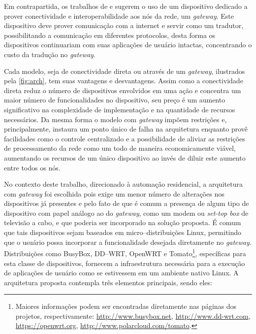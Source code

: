 \documentclass[twoside,english,brazilian]{UNISINOSmonografia}
\begin{document}
Em contrapartida, os trabalhos de  e 
 sugerem o uso de um dispositivo dedicado a prover 
conectividade e interoperabilidade aos nós da rede, um \textit{gateway}.
Este dispositivo deve prover comunicação com a internet e servir como um 
tradutor, possibilitando a comunicação em diferentes protocolos, desta forma 
os dispositivos continuariam com suas aplicações de usuário intactas, 
concentrando o custo da tradução no \textit{gateway}.


Cada modelo, seja de conectividade direta ou através de um \textit{gateway},
ilustrados pela \autoref{fig:arch}, tem suas vantagens e desvantagens.
Assim como a conectividade direta reduz o número de dispositivos envolvidos
em uma ação e concentra um maior número de funcionalidades no dispositivo,
seu preço é um aumento significativo na complexidade de implementação e 
na quantidade de recursos necessários.
Da mesma forma o modelo com \textit{gateway} impõem restrições e,
principalmente, instaura um ponto único de falha na arquitetura enquanto
provê facilidades como o controle centralizado e a possibilidade de 
aliviar as restrições de processamento da rede como um todo de maneira
economicamente viável, aumentando os recursos de um único dispositivo ao
invés de diluir este aumento entre todos os nós.


No contexto deste trabalho, direcionado à automação residencial, a arquitetura 
com \textit{gateway} foi escolhida pois exige um menor número de alterações 
nos dispositivos já presentes e pelo fato de que é comum a presença de algum 
tipo de dispositivo com papel análogo ao do \textit{gateway}, como um 
modem ou \textit{set-top box} de televisão a cabo, e que poderia ser incorporado na 
solução proposta.
É comum que tais dispositivos sejam baseados em micro--distribuições Linux,
permitindo que o usuário possa incorporar a funcionalidade desejada
diretamente no \textit{gateway}.
Distribuições como BusyBox, DD--WRT, OpenWRT e Tomato\footnote{
	Maiores informações podem ser encontradas diretamente nas páginas
	dos projetos, respectivamente:
	\url{http://www.busybox.net},
	\url{http://www.dd-wrt.com},
	\url{https://openwrt.org},
	\url{http://www.polarcloud.com/tomato}.
}, específicas para esta
classe de dispositivos, fornecem a infraestrutura necessária para a 
execução de aplicações de usuário como se estivessem em um ambiente
nativo Linux.
A arquitetura proposta contempla três elementos principais, sendo eles:
\end{document}
